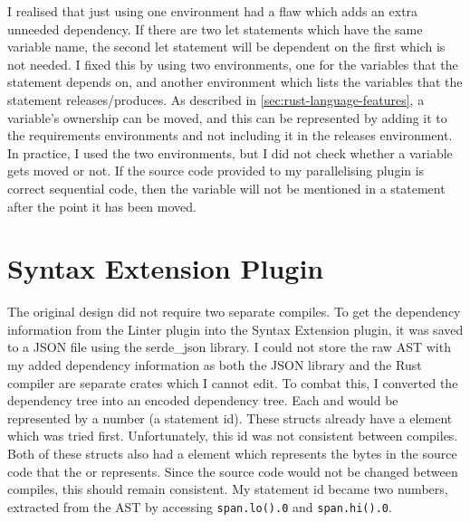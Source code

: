 
I realised that just using one environment had a flaw which adds an extra unneeded dependency. If there are two let statements which have the same variable name, the second let statement will be dependent on the first which is not needed. I fixed this by using two environments, one for the variables that the statement depends on, and another environment which lists the variables that the statement releases/produces. As described in \autoref{sec:rust-language-features}, a variable's ownership can be moved, and this can be represented by adding it to the requirements environments and not including it in the releases environment. In practice, I used the two environments, but I did not check whether a variable gets moved or not. If the source code provided to my parallelising plugin is correct sequential code, then the variable will not be mentioned in a statement after the point it has been moved.

\section{Syntax Extension Plugin}
The original design did not require two separate compiles. To get the dependency information from the Linter plugin into the Syntax Extension plugin, it was saved to a JSON file using the serde\_json library. I could not store the raw AST with my added dependency information as both the JSON library and the Rust compiler are separate crates which I cannot edit. To combat this, I converted the dependency tree into an encoded dependency tree. Each  and  would be represented by a number (a statement id). These structs already have a  element which was tried first. Unfortunately, this id was not consistent between compiles. Both of these structs also had a  element which represents the bytes in the source code that the  or  represents. Since the source code would not be changed between compiles, this should remain consistent. My statement id became two numbers, extracted from the AST by accessing \texttt{span.lo().0} and \texttt{span.hi().0}.

